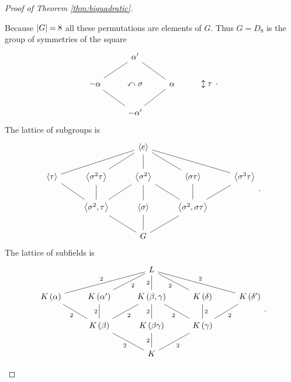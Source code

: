 \begin{proof}[Proof of Theorem \ref{thm:biquadratic}]
\begin{enumerate}
\begin{itemize}
\end{itemize}
Because $ \left\lvert G \right\rvert = 8 $ all these permutations are elements of $ G $. Thus $ G = D_8 $ is the group of symmetries of the square
$$
\begin{tikzcd}
& \alpha' & & \\
-\alpha \arrow[dash]{ur} & \curvearrowleft \sigma & \alpha \arrow[dash]{ul} & \updownarrow \tau \\
& -\alpha' \arrow[dash]{ul} \arrow[dash]{ur} & &
\end{tikzcd}.
$$
The lattice of subgroups is
$$
\begin{tikzcd}
& & \ab{e} & & \\
\ab{\tau} \arrow[dash]{urr} & \ab{\sigma^2\tau} \arrow[dash]{ur} & \ab{\sigma^2} \arrow[dash]{u} & \ab{\sigma\tau} \arrow[dash]{ul} & \ab{\sigma^3\tau} \arrow[dash]{ull} \\
& \ab{\sigma^2, \tau} \arrow[dash]{ul} \arrow[dash]{u} \arrow[dash]{ur} & \ab{\sigma} \arrow[dash]{u} & \ab{\sigma^2, \sigma\tau} \arrow[dash]{ul} \arrow[dash]{u} \arrow[dash]{ur} & \\
& & G \arrow[dash]{ul} \arrow[dash]{u} \arrow[dash]{ur} & &
\end{tikzcd}.
$$
The lattice of subfields is
$$
\begin{tikzcd}
& & L & & \\
K\rb{\alpha} \arrow[dash]{urr}{2} & K\rb{\alpha'} \arrow[dash, swap]{ur}{2} & K\rb{\beta, \gamma} \arrow[dash]{u}{2} & K\rb{\delta} \arrow[dash]{ul}{2} & K\rb{\delta'} \arrow[dash, swap]{ull}{2} \\
& K\rb{\beta} \arrow[dash]{ul}{2} \arrow[dash]{u}{2} \arrow[dash, swap]{ur}{2} & K\rb{\beta\gamma} \arrow[dash]{u}{2} & K\rb{\gamma} \arrow[dash]{ul}{2} \arrow[dash, swap]{u}{2} \arrow[dash, swap]{ur}{2} & \\
& & K \arrow[dash]{ul}{2} \arrow[dash]{u}{2} \arrow[dash, swap]{ur}{2} & &
\end{tikzcd}.
$$



\end{enumerate}
\end{proof}
